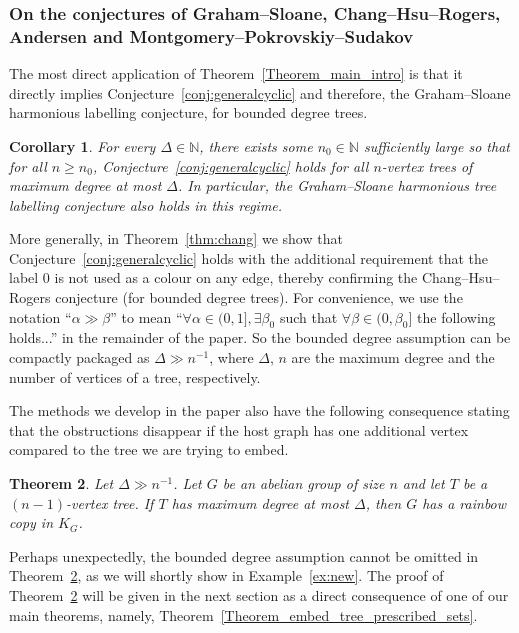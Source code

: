 \documentclass[a4paper,11pt,hidelinks]{amsart}
\newtheorem{theorem}{Theorem}[section]
\newtheorem{corollary}[theorem]{Corollary}
\theoremstyle{definition}
\begin{document}
\subsubsection{On the conjectures of Graham--Sloane, Chang--Hsu--Rogers, Andersen and Montgomery--Pokrovskiy--Sudakov}
\par The most direct application of Theorem~\ref{Theorem_main_intro} is that it directly implies Conjecture~\ref{conj:generalcyclic} and therefore, the Graham--Sloane harmonious labelling conjecture, for bounded degree trees.
\begin{corollary}\label{cor:boundeddegreeGS} For every $\Delta\in \mathbb{N}$, there exists some $n_0\in \mathbb{N}$ sufficiently large so that for all $n\geq n_0$, Conjecture~\ref{conj:generalcyclic} holds for all $n$-vertex trees of maximum degree at most $\Delta$. In particular, the Graham--Sloane harmonious tree labelling conjecture also holds in this regime.
\end{corollary}
More generally, in Theorem~\ref{thm:chang} we show that Conjecture~\ref{conj:generalcyclic} holds with the additional requirement that the label $0$ is not used as a colour on any edge, thereby confirming the Chang--Hsu--Rogers conjecture \cite{chang1981additive} (for bounded degree trees). For convenience, we use the notation ``$\alpha\gg \beta$'' to mean ``$\forall \alpha\in (0,1], \exists \beta_0$ such that $\forall\beta\in (0, \beta_0]$ the following holds...'' in the remainder of the paper. So the bounded degree assumption can be compactly packaged as $\Delta\gg n^{-1}$, where $\Delta$, $n$ are the maximum degree and the number of vertices of a tree, respectively.
\par The methods we develop in the paper also have the following consequence stating that the obstructions disappear if the host graph has one additional vertex compared to the tree we are trying to embed.
\begin{theorem}\label{thm:vertexspace}
    Let $\Delta\gg n^{-1}$. Let $G$ be an abelian group of size $n$ and let $T$ be a $(n-1)$-vertex tree. If $T$ has maximum degree at most $\Delta$, then $G$ has a rainbow copy in $K_G$. 
\end{theorem}
 Perhaps unexpectedly, the bounded degree assumption cannot be omitted in Theorem~\ref{thm:vertexspace}, as we will shortly show in Example~\ref{ex:new}. The proof of Theorem~\ref{thm:vertexspace} will be given in the next section as a direct consequence of one of our main theorems, namely, Theorem~\ref{Theorem_embed_tree_prescribed_sets}.
\end{document}
